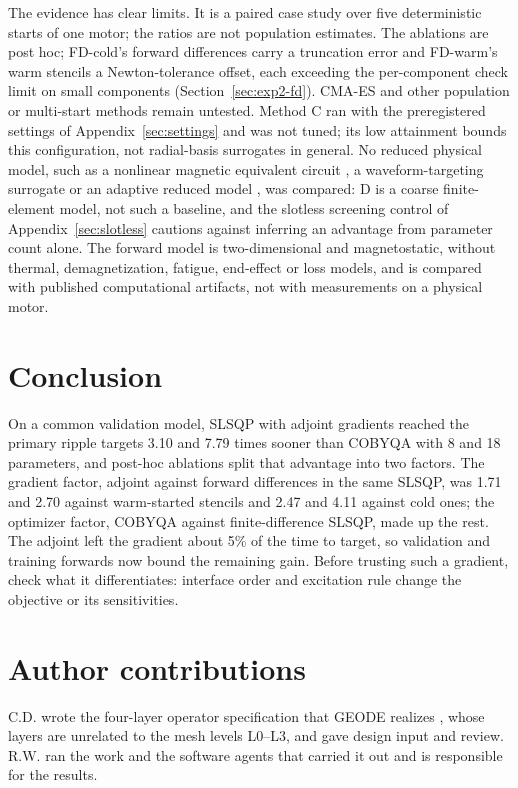 \documentclass{anvil-paper}
\begin{document}
The evidence has clear limits. It is a paired case study over five
deterministic starts of one motor; the ratios are not population estimates.
The ablations are post hoc; FD-cold's forward differences carry a truncation
error and FD-warm's warm stencils a Newton-tolerance offset, each exceeding the
per-component check limit on small components (Section~\ref{sec:exp2-fd}). CMA-ES and other population or
multi-start methods remain untested.
Method C ran with the preregistered settings of
Appendix~\ref{sec:settings} and was not tuned; its low attainment bounds
this configuration, not radial-basis surrogates in general. No reduced
physical model, such as a nonlinear magnetic equivalent circuit
\citep{kemmetmueller2015}, a waveform-targeting surrogate \citep{roomi2022}
or an adaptive reduced model \citep{wen2023}, was compared: D is a coarse finite-element model, not such a baseline, and
the slotless screening control of Appendix~\ref{sec:slotless} cautions
against inferring an advantage from parameter count alone. The forward model is two-dimensional and
magnetostatic, without thermal, demagnetization, fatigue, end-effect or
loss models, and is compared with published computational artifacts, not
with measurements on a physical motor.

\section{Conclusion}
On a common validation model, SLSQP with adjoint gradients reached the
primary ripple targets 3.10 and 7.79 times sooner than COBYQA with 8 and 18
parameters, and post-hoc ablations split that advantage into two factors.
The gradient factor, adjoint against forward differences in the same
SLSQP, was 1.71 and 2.70 against warm-started stencils and 2.47 and 4.11
against cold ones; the optimizer factor, COBYQA against finite-difference
SLSQP, made up the rest. The adjoint left the gradient about 5\% of the
time to target, so validation and training forwards now bound the
remaining gain. Before trusting such a gradient, check what it
differentiates: interface order and excitation rule change the objective
or its sensitivities.

\section*{Author contributions}
C.D. wrote the four-layer operator specification that GEODE realizes
\citep{dunnavant2026whiteroom}, whose layers are unrelated to the mesh
levels L0--L3, and gave design input and review. R.W. ran the work and the
software agents that carried it out and is responsible for the results.
\end{document}

